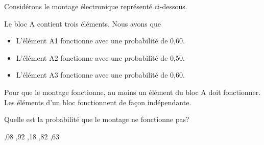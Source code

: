 \begin{questions}
\vspace{0,5cm}


\question[3]\label{probaQCM} Considérons le montage électronique représenté ci-dessous.
	
\begin{figure}[h!]
    \label{fig:montage}
    \begin{center}	 \end{center}
\end{figure}
	
 Le bloc A contient trois éléments. Nous avons que
\begin{itemize}
    \item L'élément A1 fonctionne avec une probabilité de 0,60.
    \item L'élément A2 fonctionne avec une probabilité de 0,50.
    \item L'élément A3 fonctionne avec une probabilité de 0,60.
\end{itemize}
Pour que le montage fonctionne, au moins un élément du bloc A doit fonctionner. Les éléments d'un bloc fonctionnent de façon indépendante.
	
\vspace{0,3cm}

 Quelle est la probabilité que le montage ne fonctionne pas? 


 \begin{oneparcheckboxes}
		,08
		,92
		,18 
		,82
		,63
\end{oneparcheckboxes}


\end{questions}
